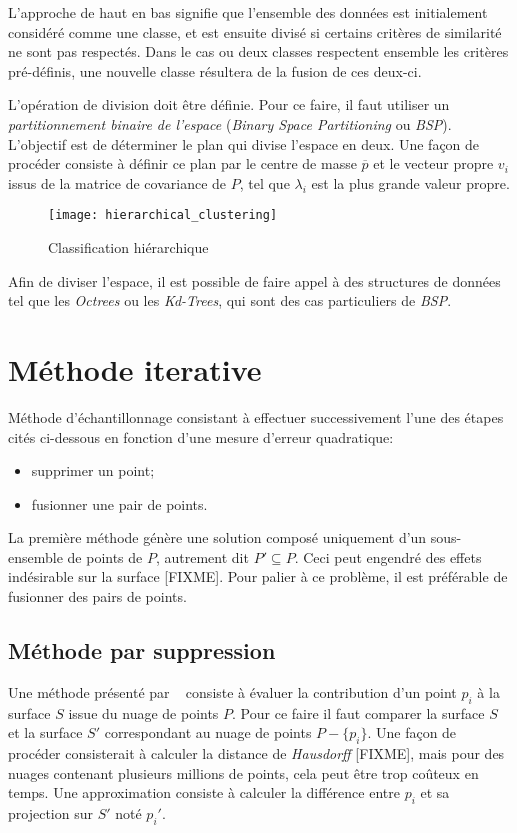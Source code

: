 L'approche de haut en bas signifie que l'ensemble des données est initialement considéré comme une classe, et est ensuite divisé si certains critères de similarité ne sont pas respectés. Dans le cas ou deux classes respectent ensemble les critères pré-définis, une nouvelle classe résultera de la fusion de ces deux-ci.

L'opération de division doit être définie. Pour ce faire, il faut utiliser un \emph{partitionnement binaire de l'espace} (\emph{Binary Space Partitioning} ou \emph{BSP}). L'objectif est de déterminer le plan qui divise l'espace en deux. Une façon de procéder consiste à définir ce plan par le centre de masse $\overline{p}$ et le vecteur propre $v_i$ issus de la matrice de covariance de $P$, tel que $\lambda_i$ est la plus grande valeur propre.

\begin{figure}
  \centering
  \texttt{[image: hierarchical\_clustering]}
  \caption{Classification hiérarchique~\cite{Pauly2002}}
  \label{fig:sampling_hierarchical}
\end{figure}

Afin de diviser l'espace, il est possible de faire appel à des structures de données tel que les \emph{Octrees} ou les \emph{Kd-Trees}, qui sont des cas particuliers de \emph{BSP}.

\section{Méthode iterative}
\begin{definition}
  Méthode d'échantillonnage consistant à effectuer successivement l'une des étapes cités ci-dessous en fonction d'une mesure d'erreur quadratique:
  \begin{itemize}
    \item supprimer un point;
    \item fusionner une pair de points.
  \end{itemize}
\end{definition}

La première méthode génère une solution composé uniquement d'un sous-ensemble de points de $P$, autrement dit $P' \subseteq P$. Ceci peut engendré des effets indésirable sur la surface [FIXME]. Pour palier à ce problème, il est préférable de fusionner des pairs de points.

\subsection{Méthode par suppression}
Une méthode présenté par \citeauthor{Alexa2001}~\cite{Alexa2001} consiste à évaluer la contribution d'un point $p_i$ à la surface $S$ issue du nuage de points $P$. Pour ce faire il faut comparer la surface $S$ et la surface $S'$ correspondant au nuage de points $P-\{p_i\}$. Une façon de procéder consisterait à calculer la distance de \emph{Hausdorff} [FIXME], mais pour des nuages contenant plusieurs millions de points, cela peut être trop coûteux en temps. Une approximation consiste à calculer la différence entre $p_i$ et sa projection sur $S'$ noté $p_i'$.\\

